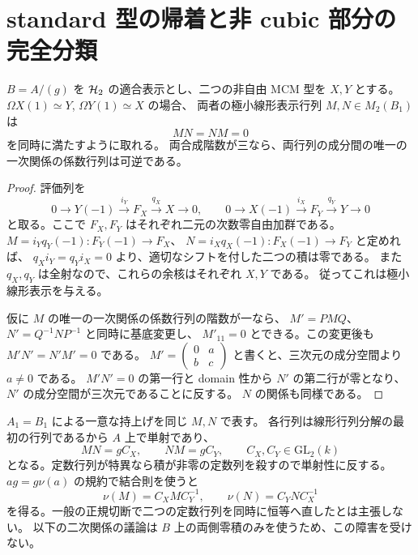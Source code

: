 \section{standard 型の帰着と非 cubic 部分の完全分類}
\label{sec:standard-rank-three}

\begin{proposition}
\label{prop:standard-mutual-zero-matrices}
$B=A/(g)$ を $\mathcal H_2$ の適合表示とし、二つの非自由 MCM 型を $X,Y$ とする。
$\Omega X(1)\simeq Y$, $\Omega Y(1)\simeq X$ の場合、
両者の極小線形表示行列 $M,N\in M_2(B_1)$ は
\[
 MN=NM=0
\]
を同時に満たすように取れる。
両合成階数が三なら、両行列の成分間の唯一の一次関係の係数行列は可逆である。
\end{proposition}
\begin{proof}
評価列を
\[
 0\longrightarrow Y(-1)\xrightarrow{i_Y}F_X
 \xrightarrow{q_X}X\longrightarrow0,
 \qquad
 0\longrightarrow X(-1)\xrightarrow{i_X}F_Y
 \xrightarrow{q_Y}Y\longrightarrow0
\]
と取る。ここで $F_X,F_Y$ はそれぞれ二元の次数零自由加群である。
$M=i_Yq_Y(-1):F_Y(-1)\to F_X$、
$N=i_Xq_X(-1):F_X(-1)\to F_Y$ と定めれば、
$q_Xi_Y=q_Yi_X=0$ より、適切なシフトを付した二つの積は零である。
また $q_X,q_Y$ は全射なので、これらの余核はそれぞれ $X,Y$ である。
従ってこれは極小線形表示を与える。

仮に $M$ の唯一の一次関係の係数行列の階数が一なら、
$M'=PMQ$、$N'=Q^{-1}NP^{-1}$ と同時に基底変更し、
$M'_{11}=0$ とできる。この変更後も $M'N'=N'M'=0$ である。
$M'=\left(\begin{smallmatrix}0&a\\b&c\end{smallmatrix}\right)$
と書くと、三次元の成分空間より $a\ne0$ である。
$M'N'=0$ の第一行と domain 性から $N'$ の第二行が零となり、
$N'$ の成分空間が三次元であることに反する。
$N$ の関係も同様である。
\end{proof}

\begin{remark}[正規切断での持上げの範囲]
$A_1=B_1$ による一意な持上げを同じ $M,N$ で表す。
各行列は線形行列分解の最初の行列であるから $A$ 上で単射であり、
\[
 MN=gC_X,\qquad NM=gC_Y,\qquad C_X,C_Y\in\mathrm{GL}_2(k)
\]
となる。定数行列が特異なら積が非零の定数列を殺すので単射性に反する。
$ag=g\nu(a)$ の規約で結合則を使うと
\[
 \nu(M)=C_XMC_Y^{-1},\qquad
 \nu(N)=C_YNC_X^{-1}
\]
を得る。一般の正規切断で二つの定数行列を同時に恒等へ直したとは主張しない。
以下の二次関係の議論は $B$ 上の両側零積のみを使うため、この障害を受けない。
\end{remark}

